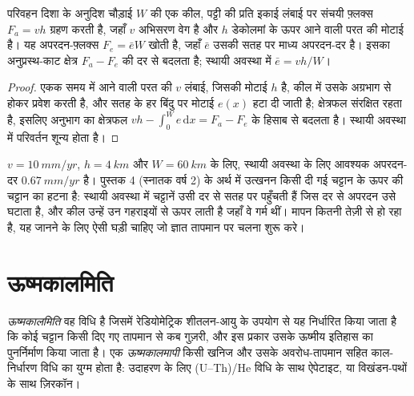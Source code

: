\begin{proposition}[स्थायी-अवस्था फ़्लक्स संतुलन]\label{prop:b3:orogenic-wedges:flux}
परिवहन दिशा के अनुदिश चौड़ाई $W$ की एक कील, पट्टी की प्रति इकाई लंबाई पर
संचयी फ़्लक्स $F_a = v h$ ग्रहण करती है, जहाँ $v$ अभिसरण वेग है
और $h$ डेकोलमां के ऊपर आने वाली परत की मोटाई है। यह
अपरदन-फ़्लक्स $F_e = \bar e W$ खोती है, जहाँ $\bar e$ उसकी सतह पर
माध्य अपरदन-दर है। इसका अनुप्रस्थ-काट क्षेत्र $F_a -
F_e$ की दर से बदलता है; स्थायी अवस्था में $\bar e = vh/W$।
\end{proposition}

\begin{proof}
एकक समय में आने वाली परत की $v$ लंबाई, जिसकी मोटाई $h$ है,
कील में उसके अग्रभाग से होकर प्रवेश करती है, और सतह के हर बिंदु पर मोटाई $e(x)$ हटा दी जाती है;
क्षेत्रफल संरक्षित रहता है, इसलिए अनुभाग का क्षेत्रफल
$vh - \int_0^W e\,\mathrm dx = F_a - F_e$ के हिसाब से बदलता है। स्थायी अवस्था में
परिवर्तन शून्य होता है।
\end{proof}

$v = \qty{10}{mm/yr}$, $h = \qty{4}{km}$ और $W = \qty{60}{km}$ के लिए, स्थायी अवस्था के लिए
आवश्यक अपरदन-दर $\qty{0.67}{mm/yr}$ है। पुस्तक 4 (स्नातक वर्ष 2) के अर्थ में
उत्खनन किसी दी गई चट्टान के ऊपर की चट्टान का हटना है:
स्थायी अवस्था में चट्टानें उसी दर से सतह पर पहुँचती हैं जिस दर से अपरदन
उसे घटाता है, और कील उन्हें उन गहराइयों से ऊपर लाती है जहाँ वे गर्म थीं। मापन
कितनी तेज़ी से हो रहा है, यह जानने के लिए ऐसी घड़ी चाहिए जो ज्ञात तापमान पर चलना शुरू करे।

\section{ऊष्मकालमिति}\label{sec:b3:orogenic-wedges:thermochronology}

\begin{definition}[ऊष्मकालमिति, ऊष्मकालमापी]\label{def:b3:orogenic-wedges:thermochronology}
\emph{ऊष्मकालमिति} वह विधि है जिसमें रेडियोमेट्रिक
शीतलन-आयु के उपयोग से यह निर्धारित किया जाता है कि कोई चट्टान किसी दिए गए
तापमान से कब गुज़री, और इस प्रकार उसके ऊष्मीय इतिहास का पुनर्निर्माण किया जाता है। एक
\emph{ऊष्मकालमापी} किसी खनिज और
उसके अवरोध-तापमान सहित काल-निर्धारण विधि का युग्म होता है: उदाहरण के लिए
(U--Th)/He विधि के साथ ऐपेटाइट, या विखंडन-पथों के साथ ज़िरकॉन।
\end{definition}

